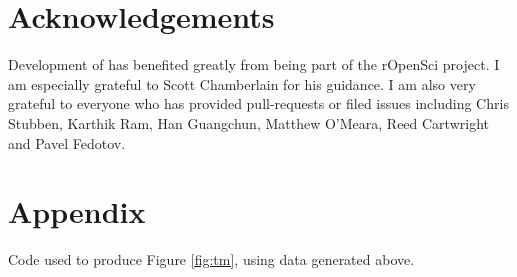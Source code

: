 \section{Acknowledgements}

Development of  has benefited greatly from being part of the
rOpenSci project. I am especially grateful to Scott Chamberlain for his guidance. 
I am also very grateful to everyone who has provided pull-requests or filed issues 
including Chris Stubben, Karthik Ram, Han Guangchun, Matthew O'Meara, 
Reed Cartwright and Pavel Fedotov.



\address{David J. Winter\\
  Institute of Fundamental Sciences, Massey University\\
  Palmerston North 4442\\
  New Zealand\\
  ORCiD: 0000-0002-6165-0029 \\
}

\section{Appendix}

Code used to produce Figure \ref{fig:tm}, using  data generated above.

